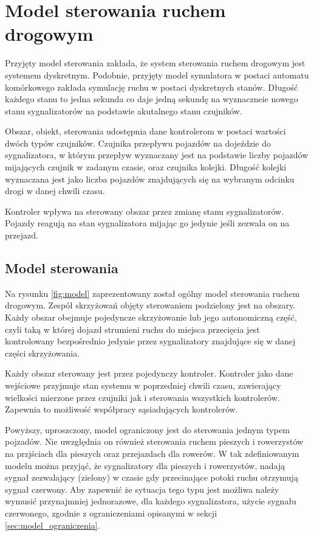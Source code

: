 \chapter{Model sterowania ruchem drogowym}
\label{chap:model}
Przyjęty model sterowania zakłada, że system sterowania ruchem drogowym jest systemem dyskretnym. Podobnie, przyjęty model symulatora w postaci automatu komórkowego zakłada symulację ruchu w postaci dyskretnych stanów. Długość każdego stanu to jedna sekunda co daje jedną sekundę na wyznaczneie nowego stanu sygnalizatorów na podstawie akutalnego stanu czujników.

Obszar, obiekt, sterowania udostępnia dane kontrolerom w postaci wartości dwóch typów czujników. Czujnika przepływu pojazdów na dojeździe do sygnalizatora, w którym przepływ wyznaczany jest na podstawie liczby pojazdów mijających czujnik w zadanym czasie, oraz czujnika kolejki. Długość kolejki wyznaczana jest jako liczba pojazdów znajdujących się na wybranym odcinku drogi w danej chwili czasu.

Kontroler wpływa na sterowany obszar przez zmianę stanu sygnalizatorów. Pojazdy reagują na stan sygnalizatora mijając go jedynie jeśli zezwala on na przejazd.

\section{Model sterowania}
\label{sec:model_opis}

Na rysunku \ref{fig:model} zaprezentowany został ogólny model sterowania ruchem drogowym.
Zespół skrzyżowań objęty sterowaniem podzielony jest na obszary.
Każdy obszar obejmuje pojedyncze skrzyżowanie lub jego autonomiczną część, czyli taką w której dojazd strumieni ruchu do miejsca przecięcia jest kontrolowany bezpośrednio jedynie przez sygnalizatory znajdujące się w danej części skrzyżowania.

Każdy obszar sterowany jest przez pojedynczy kontroler.
Kontroler jako dane wejściowe przyjmuje stan systemu w poprzedniej chwili czasu,
zawierający wielkości mierzone przez czujniki jak i sterowania wszystkich kontrolerów. Zapewnia to możliwość współpracy sąsiadujących kontrolerów.

Powyższy, uproszczony, model ograniczony jest do sterowania jednym typem pojzadów. Nie uwzględnia on również sterowania ruchem pieszych i rowerzystów na przjściach dla pieszych oraz przejazdach dla rowerów. W tak zdefiniowanym modelu można przyjąć, że sygnalizatory dla pieszych i rowerzystów, nadają sygnał zezwalający (zielony) w czasie gdy przecinające potoki ruchu otrzymują sygnał czerwony.
Aby zapewnić że sytuacja tego typu jest możliwa należy wymusić przynajmniej jednorazowe, dla każdego sygnalizatora, użycie sygnału czerwonego, zgodnie z ograniczeniami opisanymi w sekcji \ref{sec:model_ograniczenia}.

